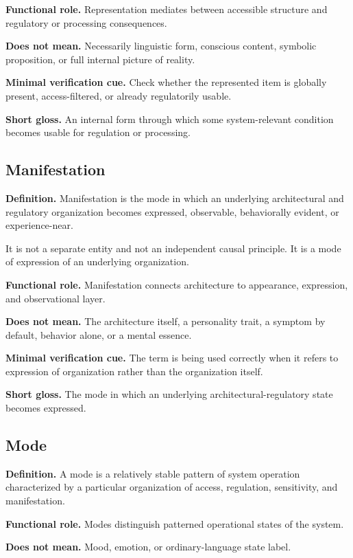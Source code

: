 \documentclass[11pt,a4paper]{article}
\begin{document}
	\textbf{Functional role.} Representation mediates between accessible structure and regulatory or processing consequences.
	
	\textbf{Does not mean.} Necessarily linguistic form, conscious content, symbolic proposition, or full internal picture of reality.
	
	\textbf{Minimal verification cue.} Check whether the represented item is globally present, access-filtered, or already regulatorily usable.
	
	\textbf{Short gloss.} An internal form through which some system-relevant condition becomes usable for regulation or processing.
	
	\subsection{Manifestation}
	
	\textbf{Definition.} Manifestation is the mode in which an underlying architectural and regulatory organization becomes expressed, observable, behaviorally evident, or experience-near.
	
	It is not a separate entity and not an independent causal principle. It is a mode of expression of an underlying organization.
	
	\textbf{Functional role.} Manifestation connects architecture to appearance, expression, and observational layer.
	
	\textbf{Does not mean.} The architecture itself, a personality trait, a symptom by default, behavior alone, or a mental essence.
	
	\textbf{Minimal verification cue.} The term is being used correctly when it refers to expression of organization rather than the organization itself.
	
	\textbf{Short gloss.} The mode in which an underlying architectural-regulatory state becomes expressed.
	
	\subsection{Mode}
	
	\textbf{Definition.} A mode is a relatively stable pattern of system operation characterized by a particular organization of access, regulation, sensitivity, and manifestation.
	
	\textbf{Functional role.} Modes distinguish patterned operational states of the system.
	
	\textbf{Does not mean.} Mood, emotion, or ordinary-language state label.
	
\end{document}
